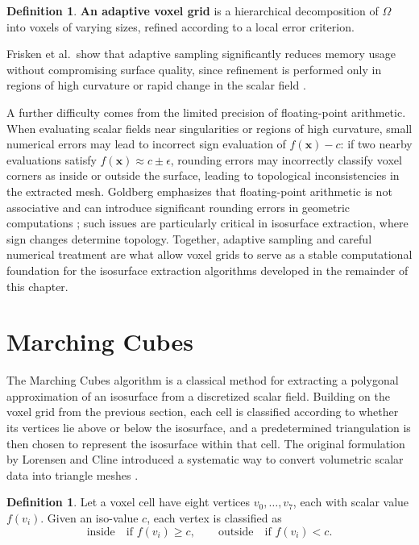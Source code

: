 \documentclass[12pt, a4paper, oneside]{book}
\theoremstyle{plain}
\theoremstyle{definition}
\newtheorem{definition}[theorem]{Definition}
\theoremstyle{remark}
\theoremstyle{definition}
\begin{document}
\begin{definition}
\textbf{An adaptive voxel grid} is a hierarchical decomposition of $\Omega$ into voxels of varying sizes, refined according to a local error criterion.
\end{definition}

Frisken et al.\ show that adaptive sampling significantly reduces memory usage without compromising surface quality, since refinement is performed only in regions of high curvature or rapid change in the scalar field \cite{frisken2000adaptively}.

A further difficulty comes from the limited precision of floating-point arithmetic. When evaluating scalar fields near singularities or regions of high curvature, small numerical errors may lead to incorrect sign evaluation of $f(\mathbf{x}) - c$: if two nearby evaluations satisfy $f(\mathbf{x}) \approx c \pm \epsilon$, rounding errors may incorrectly classify voxel corners as inside or outside the surface, leading to topological inconsistencies in the extracted mesh. Goldberg emphasizes that floating-point arithmetic is not associative and can introduce significant rounding errors in geometric computations \cite{goldberg1991every}; such issues are particularly critical in isosurface extraction, where sign changes determine topology. Together, adaptive sampling and careful numerical treatment are what allow voxel grids to serve as a stable computational foundation for the isosurface extraction algorithms developed in the remainder of this chapter.

\section{Marching Cubes}

The Marching Cubes algorithm is a classical method for extracting a polygonal approximation of an isosurface from a discretized scalar field. Building on the voxel grid from the previous section, each cell is classified according to whether its vertices lie above or below the isosurface, and a predetermined triangulation is then chosen to represent the isosurface within that cell. The original formulation by Lorensen and Cline introduced a systematic way to convert volumetric scalar data into triangle meshes \cite{lorensen1998marching}.

\begin{definition}
Let a voxel cell have eight vertices $v_0, \dots, v_7$, each with scalar value
$f(v_i)$. Given an iso-value $c$, each vertex is classified as
\[
\text{inside} \quad \text{if } f(v_i) \geq c, \qquad \text{outside} \quad \text{if }
f(v_i) < c.
\]
\end{definition}
\end{document}
